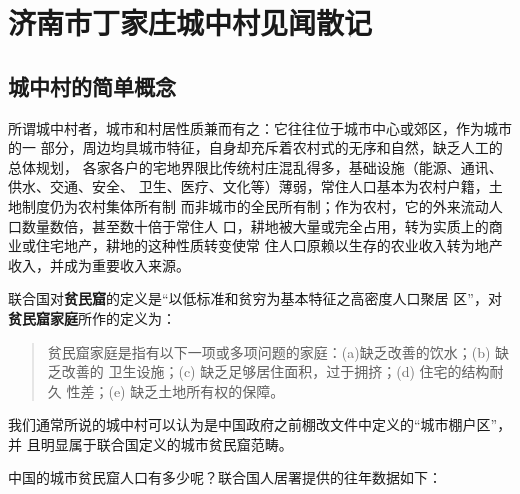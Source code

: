 \chapter{济南市丁家庄城中村见闻散记}

\section{城中村的简单概念}

所谓城中村者，城市和村居性质兼而有之：它往往位于城市中心或郊区，作为城市的一
部分，周边均具城市特征，自身却充斥着农村式的无序和自然，缺乏人工的总体规划，
各家各户的宅地界限比传统村庄混乱得多，基础设施（能源、通讯、供水、交通、安全、
卫生、医疗、文化等）薄弱，常住人口基本为农村户籍，土地制度仍为农村集体所有制
而非城市的全民所有制；作为农村，它的外来流动人口数量数倍，甚至数十倍于常住人
口，耕地被大量或完全占用，转为实质上的商业或住宅地产，耕地的这种性质转变使常
住人口原赖以生存的农业收入转为地产收入，并成为重要收入来源。

联合国对\textbf{贫民窟}的定义是“以低标准和贫穷为基本特征之高密度人口聚居
区”，对\textbf{贫民窟家庭}所作的定义为：
\begin{quotation}
  贫民窟家庭是指有以下一项或多项问题的家庭：(a)缺乏改善的饮水；(b) 缺乏改善的
  卫生设施；(c) 缺乏足够居住面积，过于拥挤；(d) 住宅的结构耐久
  性差；(e) 缺乏土地所有权的保障。
\end{quotation}

我们通常所说的城中村可以认为是中国政府之前棚改文件中定义的“城市棚户区”，并
且明显属于联合国定义的城市贫民窟范畴。\cite{unandchina}


中国的城市贫民窟人口有多少呢？联合国人居署提供的往年数据如下：
\begin{table}[!ht] \centering
  \caption{1990-2014年中国城市贫民窟人口比例及数量}
\end{table}

